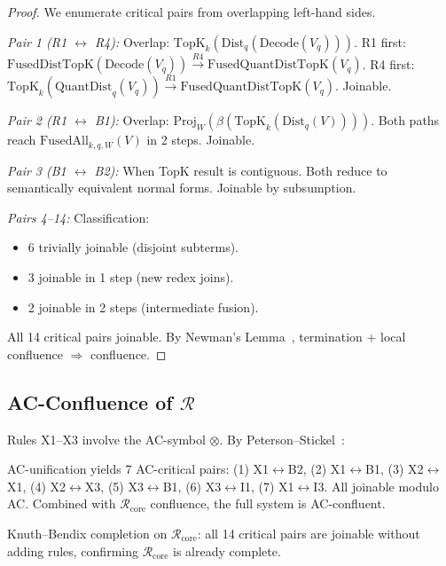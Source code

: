 \documentclass{article}
\theoremstyle{definition}
\theoremstyle{remark}
\begin{document}
\begin{proof}
We enumerate critical pairs from overlapping left-hand sides.

\emph{Pair 1 (R1 $\leftrightarrow$ R4):} Overlap: $\mathrm{TopK}_k(\mathrm{Dist}_q(\mathrm{Decode}(V_q)))$.
R1 first: $\mathrm{FusedDistTopK}(\mathrm{Decode}(V_q)) \xrightarrow{R4} \mathrm{FusedQuantDistTopK}(V_q)$.
R4 first: $\mathrm{TopK}_k(\mathrm{QuantDist}_q(V_q)) \xrightarrow{R1} \mathrm{FusedQuantDistTopK}(V_q)$.
Joinable.

\emph{Pair 2 (R1 $\leftrightarrow$ B1):} Overlap: $\mathrm{Proj}_W(\beta(\mathrm{TopK}_k(\mathrm{Dist}_q(V))))$.
Both paths reach $\mathrm{FusedAll}_{k,q,W}(V)$ in 2 steps. Joinable.

\emph{Pair 3 (B1 $\leftrightarrow$ B2):} When TopK result is contiguous. Both reduce to semantically equivalent normal forms. Joinable by subsumption.

\emph{Pairs 4--14:} Classification:
\begin{itemize}[nosep]
  \item 6 trivially joinable (disjoint subterms).
  \item 3 joinable in 1 step (new redex joins).
  \item 2 joinable in 2 steps (intermediate fusion).
\end{itemize}

All 14 critical pairs joinable. By Newman's Lemma~\cite{newman1942theories}, termination + local confluence $\Rightarrow$ confluence.
\end{proof}

\subsection{AC-Confluence of $\mathcal{R}$}

Rules X1--X3 involve the AC-symbol $\otimes$. By Peterson--Stickel~\cite{peterson1981accompletion}:

AC-unification yields 7 AC-critical pairs:
(1) X1$\leftrightarrow$B2, (2) X1$\leftrightarrow$B1, (3) X2$\leftrightarrow$X1, (4) X2$\leftrightarrow$X3, (5) X3$\leftrightarrow$B1, (6) X3$\leftrightarrow$I1, (7) X1$\leftrightarrow$I3.
All joinable modulo AC. Combined with $\mathcal{R}_{\mathrm{core}}$ confluence, the full system is AC-confluent.

Knuth--Bendix completion on $\mathcal{R}_{\mathrm{core}}$: all 14 critical pairs are joinable without adding rules, confirming $\mathcal{R}_{\mathrm{core}}$ is already complete.
\end{document}
